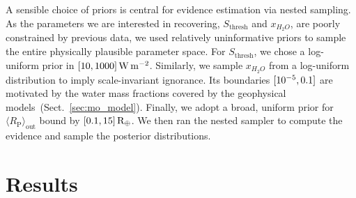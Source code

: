 \documentclass[twocolumn]{aastex631}
\begin{document}
A sensible choice of priors is central for evidence estimation via nested sampling.
As the parameters we are interested in recovering, $S_\mathrm{thresh}$ and $x_{H_2O}$, are poorly constrained by previous data, we used relatively uninformative priors to sample the entire physically plausible parameter space.
For $S_\mathrm{thresh}$, we chose a log-uniform prior in $[10,1000]\, \SI{}{\watt\per\meter\squared}$.
Similarly, we sample $x_{H_2O}$ from a log-uniform distribution to imply scale-invariant ignorance.
Its boundaries $[10^{-5}, 0.1]$ are motivated by the water mass fractions covered by the geophysical models~(Sect.~\ref{sec:mo_model}).
Finally, we adopt a broad, uniform prior for $\langle R_\mathrm{P}\rangle_\mathrm{out}$ bound by $[0.1, 15] \, \mathrm{R_\oplus}$.
We then ran the nested sampler to compute the evidence and sample the posterior distributions.



\section{Results}
\end{document}
